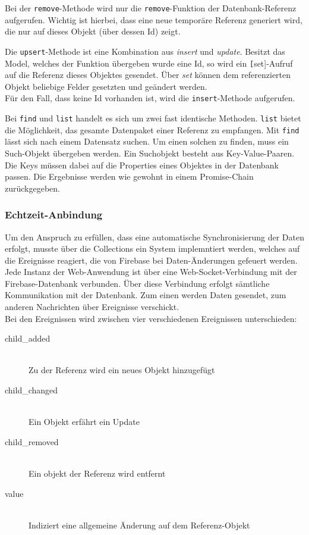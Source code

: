 Bei der \texttt{remove}-Methode wird nur die \texttt{remove}-Funktion der Datenbank-Referenz aufgerufen. Wichtig ist hierbei, dass eine neue temporäre Referenz generiert wird, die nur
auf dieses Objekt (über dessen Id) zeigt.

Die \texttt{upsert}-Methode ist eine Kombination aus \textit{insert} und \textit{update}. Besitzt das Model, welches der Funktion übergeben wurde eine Id, so wird ein \texttt[set]-Aufruf auf die Referenz
dieses Objektes gesendet. Über \textit{set} können dem referenzierten Objekt beliebige Felder gesetzten und geändert werden.\\
Für den Fall, dass keine Id vorhanden ist, wird die \texttt{insert}-Methode aufgerufen.

Bei \texttt{find} und \texttt{list} handelt es sich um zwei fast identische Methoden. \texttt{list} bietet die Möglichkeit, das gesamte Datenpaket einer Referenz zu empfangen.
Mit \texttt{find} lässt sich nach einem Datensatz suchen. Um einen solchen zu finden, muss ein Such-Objekt übergeben werden.
Ein Suchobjekt besteht aus Key-Value-Paaren. Die Keys müssen dabei auf die Properties eines Objektes in der Datenbank passen.
Die Ergebnisse werden wie gewohnt in einem Promise-Chain zurückgegeben.

\subsubsection{Echtzeit-Anbindung}
Um den Anspruch zu erfüllen, dass eine automatische Synchronisierung der Daten erfolgt, musste über die Collections ein System implemntiert werden, welches
auf die Ereignisse reagiert, die von Firebase bei Daten-Änderungen gefeuert werden.\\
Jede Instanz der Web-Anwendung ist über eine Web-Socket-Verbindung mit der Firebase-Datenbank verbunden.
Über diese Verbindung erfolgt sämtliche Kommunikation mit der Datenbank. Zum einen werden Daten gesendet, zum anderen Nachrichten über Ereignisse verschickt.\\
Bei den Ereignissen wird zwischen vier verschiedenen Ereignissen unterschieden:
\begin{description}
\item[child_added]\hfill \\
Zu der Referenz wird ein neues Objekt hinzugefügt
\item[child_changed]\hfill \\
Ein Objekt erfährt ein Update
\item[child_removed]\hfill \\
Ein objekt der Referenz wird entfernt
\item[value]\hfill \\
Indiziert eine allgemeine Änderung auf dem Referenz-Objekt
\end{description}

